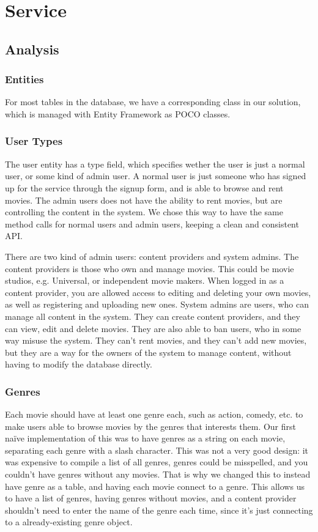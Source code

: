 \section{Service}
\label{Design_Service}

\subsection{Analysis}
\label{Design_Service_Analysis}

\subsubsection{Entities}
For most tables in the database, we have a corresponding class in our solution, which is managed with Entity Framework as POCO classes. 

\subsubsection{User Types}
The user entity has a type field, which specifies wether the user is just a normal user, or some kind of admin user. A normal user is just someone who has signed up for the service through the signup form, and is able to browse and rent movies. The admin users does not have the ability to rent movies, but are controlling the content in the system. We chose this way to have the same method calls for normal users and admin users, keeping a clean and consistent API. 

There are two kind of admin users: content providers and system admins. The content providers is those who own and manage movies. This could be movie studios, e.g. Universal, or independent movie makers. When logged in as a content provider, you are allowed access to editing and deleting your own movies, as well as registering and uploading new ones. System admins are users, who can manage all content in the system. They can create content providers, and they can view, edit and delete movies. They are also able to ban users, who in some way misuse the system. They can't rent movies, and they can't add new movies, but they are a way for the owners of the system to manage content, without having to modify the database directly.

\subsubsection{Genres}
Each movie should have at least one genre each, such as action, comedy, etc. to make users able to browse movies by the genres that interests them. Our first naïve implementation of this was to have genres as a string on each movie, separating each genre with a slash character. This was not a very good design: it was expensive to compile a list of all genres, genres could be misspelled, and you couldn't have genres without any movies. That is why we changed this to instead have genre as a table, and having each movie connect to a genre. This allows us to have a list of genres, having genres without movies, and a content provider shouldn't need to enter the name of the genre each time, since it's just connecting to a already-existing genre object.

